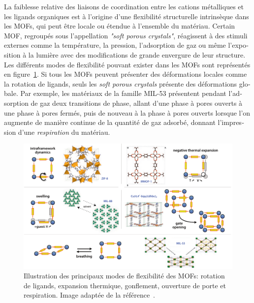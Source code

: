\documentclass[thesis]{subfiles}
\begin{document}
\begin{otherlanguage}{french}
La faiblesse relative des liaisons de coordination entre les cations métalliques
et les ligands organiques est à l'origine d'une flexibilité structurelle
intrinsèque dans les MOFs, qui peut être locale ou étendue à l'ensemble du
matériau. Certain MOF, regroupés sous l'appellation \emph{"soft porous
crystals"}, réagissent à des stimuli externes comme la température, la pression,
l'adsorption de gaz ou même l'exposition à la lumière avec des modifications de
grande envergure de leur structure. Les différents modes de flexibilité pouvant
exister dans les MOFs sont représentés en figure~\ref{fig:fr:mof-flexibility}.
Si tous les MOFs peuvent présenter des déformations locales comme la rotation de
ligands, seuls les \emph{soft porous crystals} présente des déformations
globale. Par exemple, les matériaux de la famille MIL-53 présentent pendant
l'adsorption de gaz deux transitions de phase, allant d'une phase à pores
ouverts à une phase à pores fermés, puis de nouveau à la phase à pores
ouverts\cite{Serre2002} lorsque l'on augmente de manière continue de la quantité
de gaz adsorbé, donnant l'impression d'une \emph{respiration} du matériau.

\begin{figure}[ht]
    \centering
    \includegraphics[width=\textwidth]{figures/cited/mof-flexibility}
    \caption{Illustration des principaux modes de flexibilité des MOFs: rotation
    de ligands, expansion thermique, gonflement, ouverture de porte et
    respiration. Image adaptée de la référence~\cite{Coudert2011}.}
    \label{fig:fr:mof-flexibility}
\end{figure}


\end{otherlanguage}
\end{document}
